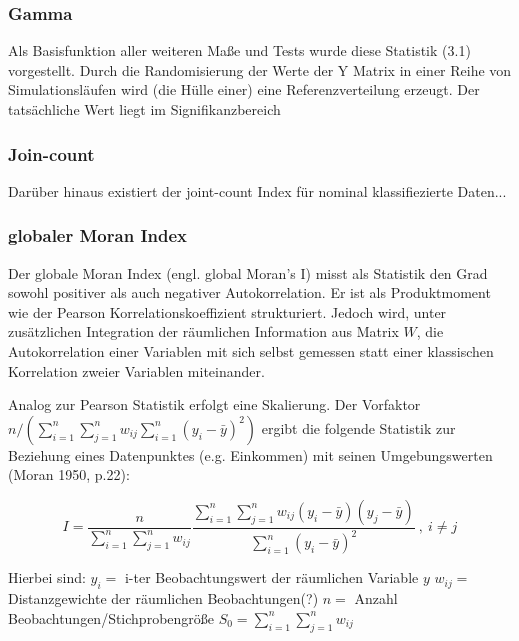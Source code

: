 \subsubsection{Gamma}
Als Basisfunktion aller weiteren Maße und Tests wurde diese Statistik (3.1) vorgestellt. 
Durch die Randomisierung der Werte der Y Matrix in einer Reihe von Simulationsläufen wird (die Hülle einer) eine Referenzverteilung erzeugt. 
Der tatsächliche Wert liegt im Signifikanzbereich

\subsubsection{Join-count}
Darüber hinaus existiert der joint-count Index für nominal klassifiezierte Daten...

\subsubsection{globaler Moran Index}
Der globale Moran Index (engl. global Moran’s I) 
misst als Statistik den Grad sowohl positiver als auch negativer Autokorrelation. 
Er ist als Produktmoment wie der Pearson Korrelationskoeffizient strukturiert. 
Jedoch wird, unter zusätzlichen Integration der räumlichen Information aus Matrix $W$, 
die Autokorrelation einer Variablen mit sich selbst gemessen statt einer klassischen Korrelation zweier Variablen miteinander. 


\begin{definition} \label{def:global-moran}
    Analog zur Pearson Statistik erfolgt eine Skalierung. 
    Der Vorfaktor  $n \big/ \left( \sum_{i=1}^{n} \sum_{j=1}^{n} w_{ij} \sum_{i=1}^{n} \left(y_i-\bar{y}\right)^2 \right) $ 
    ergibt die folgende Statistik zur Beziehung eines Datenpunktes (e.g. Einkommen) mit seinen Umgebungswerten (Moran 1950, p.22):
    
\begin{equation}
    I=\frac{n}{\sum_{i=1}^{n}\sum_{j=1}^{n} w_{ij}} 
        \frac{\sum_{i=1}^{n}\sum_{j=1}^{n}{w_{ij} \left( y_i-\bar{y} \right) \left( y_j-\bar{y} \right) }}  
        {\sum_{i=1}^{n} \left( y_i-\bar{y} \right)^2} ~ , ~ i \neq j
\end{equation}

Hierbei sind: 
	$y_i=$ i-ter Beobachtungswert der räumlichen Variable $y$
	$w_{ij}=$ Distanzgewichte der räumlichen Beobachtungen(?)
	$n=$ Anzahl Beobachtungen/Stichprobengröße
	$S_0= \sum_{i=1}^{n} \sum_{j=1}^{n} w_{ij}$

\end{definition}

